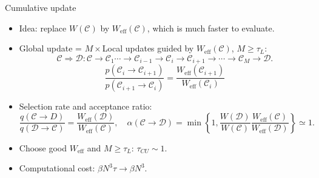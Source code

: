 \documentclass[xcolor=table, 10pt, aspectratio=169]{beamer}
\begin{document}
\begin{frame}{Cumulative update}
  \begin{itemize}
    \item Idea: replace $W(\mathcal C)$ by $W_{\text{eff}}(\mathcal C)$, which is much faster to evaluate.
    \item Global update = $M\times$Local updates guided by $W_{\text{eff}}(\mathcal C)$, $M\geq\tau_L$:
    \[\mathcal C\Rightarrow\mathcal D:
    \mathcal C\rightarrow\mathcal C_1\cdots\rightarrow\mathcal C_{i-1}\rightarrow\mathcal C_i\rightarrow\mathcal C_{i+1}\rightarrow\cdots\rightarrow\mathcal C_M\rightarrow\mathcal D.\]
    \[\frac{p(\mathcal C_i\rightarrow\mathcal C_{i+1})}{p(\mathcal C_{i+1}\rightarrow\mathcal C_i)}=\frac{W_{\text{eff}}(\mathcal C_{i+1})}{W_{\text{eff}}(\mathcal C_i)}\]
    \item Selection rate and acceptance ratio:
    \[\frac{q(\mathcal C\rightarrow D)}
    {q(\mathcal D\rightarrow\mathcal C)}
    =\frac{W_{\text{eff}}(\mathcal D)}{W_{\text{eff}}(\mathcal C)},\quad
    \alpha(\mathcal C\rightarrow \mathcal D)=\min\left\{1, \frac{W(\mathcal D)}{W(\mathcal C)}
    \frac{W_{\text{eff}}(\mathcal C)}{W_{\text{eff}}(\mathcal D)}\right\}\simeq1.\]
		\item Choose good $W_{\text{eff}}$ and $M\geq\tau_L$: $\tau_{CU}\sim1$.
    \item Computational cost: $\beta N^3\tau\rightarrow \beta N^3$.
  \end{itemize}
\end{frame}
\end{document}
